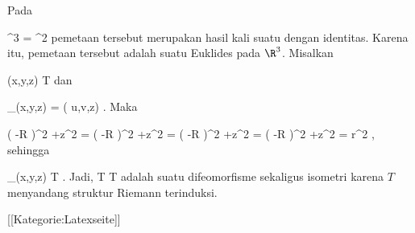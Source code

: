 Pada

\mavergleichskettedisp
{\vergleichskette
{ \R^3
}
{ =} { \R^2 \times \R
}
{ } {
}
{ } {
}
{ } {
}
}
{}{}{}
pemetaan tersebut merupakan hasil kali suatu
dengan identitas. Karena itu, pemetaan tersebut adalah suatu
Euklides pada $\R^3$. Misalkan

\mavergleichskette
{\vergleichskette
{ (x,y,z)
}
{ \in }{  T
}
{  }{
}
{    }{
}
{   }{
}
}
{}{}{}
dan

\mavergleichskettedisp
{\vergleichskette
{ \Psi_\alpha(x,y,z)
}
{ =} { ( u,v,z)
}
{ } {
}
{ } {
}
{ } {
}
}
{}{}{.}
Maka

\mavergleichskettealigndrucklinks
{\vergleichskettealigndrucklinks
{ \left(   -R  \right)^2 +z^2
}
{ =} { \left(   -R  \right)^2 +z^2
}
{ =} { \left(   -R  \right)^2 +z^2
}
{ =} { \left(   -R  \right)^2 +z^2
}
{ =} { r^2
}
}
{}{}{,}
sehingga

\mavergleichskette
{\vergleichskette
{ \Psi_\alpha(x,y,z)
}
{ \in }{  T
}
{  }{
}
{    }{
}
{   }{
}
}
{}{}{.}
Jadi,
\maabbdisp {\Psi_\alpha} { T} {T
} {}
adalah suatu difeomorfisme sekaligus isometri karena $T$ menyandang struktur Riemann terinduksi.

 [[Kategorie:Latexseite]]
